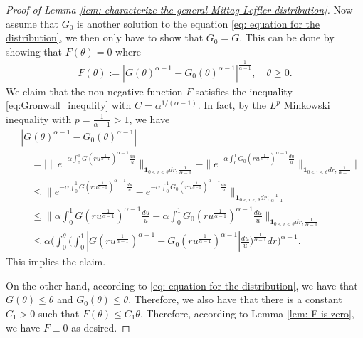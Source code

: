 \documentclass[12pt,a4paper]{amsart}
\theoremstyle{definition}
\numberwithin{equation}{section}
\begin{document}
\begin{proof}[Proof of Lemma \ref{lem: characterize the general Mittag-Leffler distribution}]
Now assume that $G_0$ is another solution to the equation \eqref{eq: equation for the distribution}, we then only have to show that $G_0 = G$.
This can be done by showing that $F(\theta) = 0$ where
  \begin{align}
    F(\theta)
    := |G(\theta)^{\alpha - 1} - G_0(\theta)^{\alpha - 1}|^{\frac{1}{\alpha - 1}},
    \quad \theta \geq 0.
  \end{align}
  We claim that the non-negative function $F$ satisfies the inequality \eqref{eq:Gronwall_inequlity} with $C = \alpha ^{1/(\alpha - 1)}$.
	In fact, by the $L^p$ Minkowski inequality with $p = \frac{1}{\alpha - 1} > 1$, we have
  \begin{align}
    &|G(\theta)^{\alpha - 1} - G_0(\theta)^{\alpha - 1}|
    \\&\quad = \Big| \|e^{-\alpha \int_0^1 G(ru^{\frac{1}{\alpha - 1}})^{\alpha - 1} \frac{du}{u}} \|_{\mathbf 1_{0<r<\theta} dr; \frac{1}{\alpha - 1}} - \|e^{-\alpha \int_0^1 G_0(ru^{ \frac{1} {\alpha - 1}})^{\alpha - 1} \frac{du}{u}} \|_{\mathbf 1_{0<r<\theta}dr;\frac{1}{\alpha - 1}} \Big|
    \\ & \quad \leq \| e^{-\alpha \int_0^1 G(ru^{\frac{1}{\alpha - 1}})^{\alpha - 1} \frac{du}{u}} - e^{-\alpha \int_0^1 G_0(ru^{\frac{1}{\alpha - 1}})^{\alpha - 1} \frac{du}{u}} \|_{\mathbf 1_{0<r<\theta}dr;\frac{1} {\alpha - 1}}
    \\ & \quad \leq \Big\| \alpha \int_0^1 G(ru^{\frac{1}{\alpha - 1}})^{\alpha - 1} \frac{du}{u} - \alpha \int_0^1 G_0(ru^{\frac{1}{\alpha - 1}})^{\alpha - 1} \frac{du}{u} \Big\|_{\mathbf 1_{0<r<\theta}dr;\frac{1} {\alpha - 1}}
    \\ & \quad \leq \alpha \Bigg( \int_0^\theta \Big( \int_0^1 |G(ru^{\frac{1}{\alpha - 1}})^{\alpha - 1} - G_0(ru^{\frac{1}{\alpha - 1}})^{\alpha - 1}| \frac{du}{u} \Big)^{\frac{1}{\alpha - 1}} dr \Bigg)^{\alpha - 1}.
  \end{align}
  This implies the claim.

  On the other hand, according to \eqref{eq: equation for the distribution}, we have that $G(\theta) \leq \theta$ and $G_0(\theta) \leq \theta$.
  Therefore, we also have that there is a constant $C_1 > 0$ such that $F(\theta) \leq C_1 \theta$.
  Therefore, according to Lemma \ref{lem: F is zero}, we have $F \equiv 0$ as desired.
\end{proof}
\end{document}
